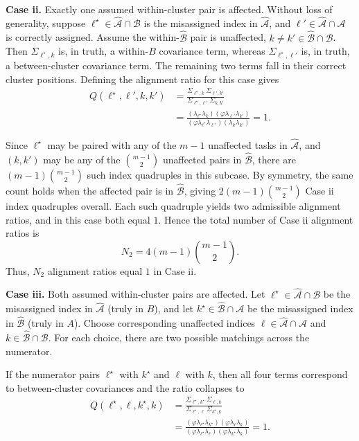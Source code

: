 \documentclass[
  american,
  man,floatsintext]{apa7}
\begin{document}
\textbf{Case ii.} Exactly one assumed within-cluster pair is affected. Without loss of generality, suppose \(\ell^\star\in \widehat{\mathcal A}\cap \mathcal B\) is the misassigned index in \(\widehat{\mathcal A}\), and \(\ell'\in \widehat{\mathcal A}\cap \mathcal A\) is correctly assigned. Assume the within-\(\widehat{\mathcal B}\) pair is unaffected, \(k\neq k'\in \widehat{\mathcal B}\cap \mathcal B\). Then \(\Sigma_{\ell^\star,k}\) is, in truth, a within-\(B\) covariance term, whereas \(\Sigma_{\ell^\star,\ell'}\) is, in truth, a between-cluster covariance term. The remaining two terms fall in their correct cluster positions. Defining the alignment ratio for this case gives
\[
\begin{aligned}
Q(\ell^\star,\ell',k,k')
&=
\frac{\Sigma_{\ell^\star,k}\ \Sigma_{\ell',k'}}{\Sigma_{\ell^\star,\ell'}\ \Sigma_{k,k'}}
\\
&=
\frac{(\lambda_{\ell^\star} \lambda_k)(\varphi \lambda_{\ell'} \lambda_{k'})}{(\varphi \lambda_{\ell^\star} \lambda_{\ell'})(\lambda_k \lambda_{k'})}
=
1.
\end{aligned}
\]

Since \(\ell^\star\) may be paired with any of the \(m-1\) unaffected tasks in \(\widehat{\mathcal A}\), and \((k,k')\) may be any of the \(\binom{m-1}{2}\) unaffected pairs in \(\widehat{\mathcal B}\), there are \((m-1)\binom{m-1}{2}\) such index quadruples in this subcase. By symmetry, the same count holds when the affected pair is in \(\widehat{\mathcal B}\), giving \(2(m-1)\binom{m-1}{2}\) Case ii index quadruples overall. Each such quadruple yields two admissible alignment ratios, and in this case both equal \(1\). Hence the total number of Case ii alignment ratios is
\[
N_2=4(m-1)\binom{m-1}{2}.
\]
Thus, \(N_2\) alignment ratios equal \(1\) in Case ii.

\textbf{Case iii.} Both assumed within-cluster pairs are affected. Let \(\ell^\star\in \widehat{\mathcal A}\cap \mathcal B\) be the misassigned index in \(\widehat{\mathcal A}\) (truly in \(B\)), and let \(k^\star\in \widehat{\mathcal B}\cap \mathcal A\) be the misassigned index in \(\widehat{\mathcal B}\) (truly in \(A\)). Choose corresponding unaffected indices \(\ell\in \widehat{\mathcal A}\cap \mathcal A\) and \(k\in \widehat{\mathcal B}\cap \mathcal B\). For each choice, there are two possible matchings across the numerator.

If the numerator pairs \(\ell^\star\) with \(k^\star\) and \(\ell\) with \(k\), then all four terms correspond to between-cluster covariances and the ratio collapses to
\[
\begin{aligned}
Q(\ell^\star,\ell,k^\star,k)
&= 
\frac{\Sigma_{\ell^\star,k^\star}\ \Sigma_{\ell,k}}{\Sigma_{\ell^\star,\ell}\ \Sigma_{k^\star,k}}\\
&=
\frac{(\varphi \lambda_{\ell^\star} \lambda_{k^\star})(\varphi \lambda_{\ell} \lambda_{k})}{(\varphi \lambda_{\ell^\star} \lambda_{\ell})(\varphi \lambda_{k^\star} \lambda_{k})}
=1.
\end{aligned}
\]
\end{document}
